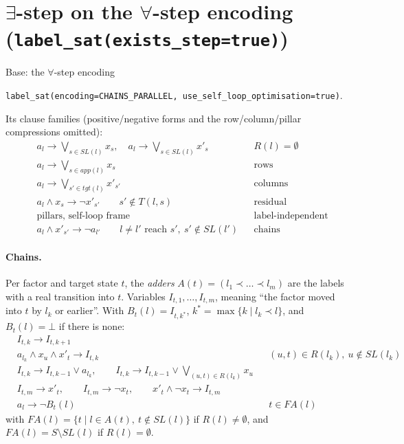 \documentclass[11pt,a4paper]{article}
\newcommand{\lab}[1]{a_{#1}}            %
\newcommand{\st}[1]{x_{#1}}             %
\newcommand{\stn}[1]{x'_{#1}}           %
\newcommand{\SL}{\mathit{SL}}
\newcommand{\R}{R}
\newcommand{\tgt}{\mathit{tgt}}
\newcommand{\app}{\mathit{app}}
\newcommand{\FA}{\mathit{FA}}
\newcommand{\Bef}{B}
\begin{document}
\section{$\exists$-step on the $\forall$-step encoding (\texttt{label\_sat(exists\_step=true)})}

Base: the $\forall$-step encoding
\begin{center}\texttt{label\_sat(encoding=CHAINS\_PARALLEL, use\_self\_loop\_optimisation=true)}.\end{center}
Its clause families (positive/negative forms and the
row/column/pillar compressions omitted):
\begin{align}
  &\lab{l} \to \textstyle\bigvee_{s \in \SL(l)} \st{s},\quad
   \lab{l} \to \textstyle\bigvee_{s \in \SL(l)} \stn{s} && \R(l) = \emptyset \tag{L1}\\
  &\lab{l} \to \textstyle\bigvee_{s \in \app(l)} \st{s} && \text{rows} \tag{L2}\\
  &\lab{l} \to \textstyle\bigvee_{s' \in \tgt(l)} \stn{s'} && \text{columns} \tag{L3}\\
  &\lab{l} \wedge \st{s} \to \neg\stn{s'} \qquad s' \notin T(l,s) && \text{residual} \tag{L4}\\
  &\text{pillars, self-loop frame} && \text{label-independent} \tag{L5}\\
  &\lab{l} \wedge \stn{s'} \to \neg \lab{l'} \qquad l \neq l' \text{ reach } s',\ s' \notin \SL(l') && \text{chains} \tag{L6}
\end{align}

\paragraph{Chains.} Per factor and target state $t$, the \emph{adders}
$A(t) = (l_1 \prec \dots \prec l_m)$ are the labels with a real transition into $t$. Variables
$I_{t,1},\dots,I_{t,m}$, meaning ``the factor moved into $t$ by $l_k$ or earlier''. With
$\Bef_t(l) = I_{t,k^*}$, $k^* = \max\{k \mid l_k \prec l\}$, and $\Bef_t(l) = \bot$ if there is none:
\begin{align}
  &I_{t,k} \to I_{t,k+1} \tag{E1}\\
  &\lab{l_k} \wedge \st{u} \wedge \stn{t} \to I_{t,k} && (u,t) \in \R(l_k),\ u \notin \SL(l_k) \tag{E2}\\
  &I_{t,k} \to I_{t,k-1} \vee \lab{l_k},\qquad
   I_{t,k} \to I_{t,k-1} \vee \textstyle\bigvee_{(u,t) \in \R(l_k)} \st{u} \tag{E3}\\
  &I_{t,m} \to \stn{t},\qquad I_{t,m} \to \neg\st{t},\qquad \stn{t} \wedge \neg\st{t} \to I_{t,m} \tag{E4}\\
  &\lab{l} \to \neg \Bef_t(l) && t \in \FA(l) \tag{E5}
\end{align}
with $\FA(l) = \{t \mid l \in A(t),\ t \notin \SL(l)\}$ if $\R(l) \neq \emptyset$, and
$\FA(l) = S \setminus \SL(l)$ if $\R(l) = \emptyset$.
\end{document}
